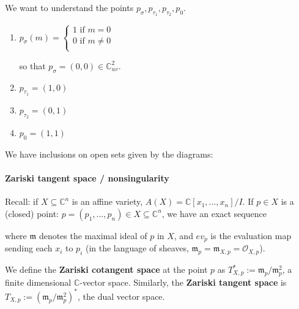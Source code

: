 \documentclass[a4paper,12pt]{amsart}
\newcommand{\CC}{\mathbb{C}}
\begin{document}
We want to understand the points $p_\sigma, p_{\tau_1}, p_{\tau_2}, p_0$.
\begin{enumerate}
	\item $p_\sigma(m) = \begin{cases}
	1 \text{ if } m = 0 \\
	0 \text{ if } m \neq 0 \\
	\end{cases}$
	
	so that $p_\sigma = (0,0) \in \CC^2_{uv}$.
	\item $p_{\tau_1} = (1,0)$
	\item $p_{\tau_2} = (0,1)$
	\item $p_{0} = (1,1)$
\end{enumerate}
We have inclusions on open sets given by the diagrams:
\begin{center}
\end{center}

\paragraph{Zariski tangent space / nonsingularity}
Recall: if $X \subseteq \CC^n$ is an affine variety, $A(X) = \CC[x_1, ..., x_n]/I$. If $p \in X$ is a (closed) point: $p = (p_1, ..., p_n) \in X \subseteq \CC^n$, we have an exact sequence 
\begin{center}
\end{center}
where $\mathfrak{m}$ denotes the maximal ideal of $p$ in $X$, and $ev_p$ is the evaluation map sending each $x_i$ to $p_i$ (in the language of sheaves, $\mathfrak{m}_p = \mathfrak{m}_{X,p} = \mathcal{O}_{X,p}$).

We define the \textbf{Zariski cotangent space} at the point $p$ as $T^*_{X, p} := \mathfrak{m}_p / \mathfrak{m}_p^2$, a finite dimensional $\CC$-vector space. Similarly, the \textbf{Zariski tangent space} is $T_{X,p} := (\mathfrak{m}_p / \mathfrak{m}_p^2)^*$, the dual vector space.
\end{document}
